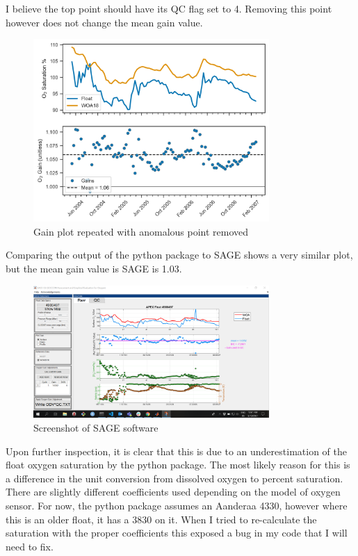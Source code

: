 \documentclass[11pt,english]{article} %
\begin{document}
I believe the top point should have its QC flag set to 4. Removing this point
however does not change the mean gain value.

\begin{figure}[H]
    \centering
    \includegraphics[width=0.8\textwidth]{../figures/4900497/new_gainplot.png}
    \caption{Gain plot repeated with anomalous point removed}
\end{figure}

Comparing the output of the python package to SAGE shows a very similar plot,
but the mean gain value is SAGE is 1.03.

\begin{figure}[H]
    \centering
    \includegraphics[width=0.8\textwidth]{../figures/4900497/SAGE_screenshot.png}
    \caption{Screenshot of SAGE software}
\end{figure}

Upon further inspection, it is clear that this is due to an underestimation of
the float oxygen saturation by the python package. The most likely reason for
this is a difference in the unit conversion from dissolved oxygen to percent
saturation. There are slightly different coefficients used depending on the model
of oxygen sensor. For now, the python package assumes an Aanderaa 4330, however
where this is an older float, it has a 3830 on it. When I tried to re-calculate
the saturation with the proper coefficients this exposed a bug in my code that
I will need to fix.
\end{document}

